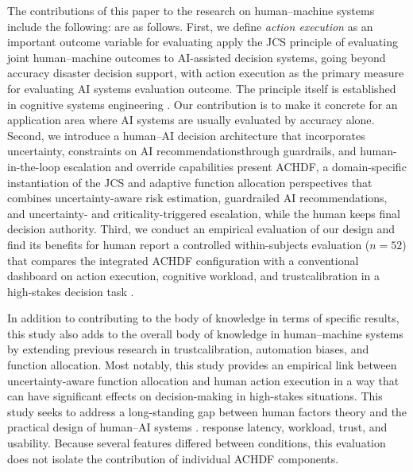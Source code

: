\documentclass[journal]{IEEEtran}
\theoremstyle{plain}
\theoremstyle{definition}
\providecommand{\DIFaddtex}[1]{{\protect\color{blue} \sf #1}} %
\providecommand{\DIFdeltex}[1]{{\protect\color{red} \scriptsize #1}} %
\providecommand{\DIFaddbegin}{} %
\providecommand{\DIFaddend}{} %
\providecommand{\DIFdelbegin}{} %
\providecommand{\DIFdelend}{} %
\providecommand{\DIFadd}[1]{\texorpdfstring{\DIFaddtex{#1}}{#1}} %
\providecommand{\DIFdel}[1]{\texorpdfstring{\DIFdeltex{#1}}{}} %
\newcommand{\DIFscaledelfig}{0.5}
\newlength{\DIFdelgraphicswidth} %
\newlength{\DIFdelgraphicsheight} %
\newcommand{\DIFaddincludegraphics}[2][]{{\color{blue}\fbox{\DIFOincludegraphics[#1]{#2}}}} %
\newcommand{\DIFdelincludegraphics}[2][]{%
\sbox{\DIFdelgraphicsbox}{\DIFOincludegraphics[#1]{#2}}%
\settoboxwidth{\DIFdelgraphicswidth}{\DIFdelgraphicsbox} %
\settoboxtotalheight{\DIFdelgraphicsheight}{\DIFdelgraphicsbox} %
\scalebox{\DIFscaledelfig}{%
\parbox[b]{\DIFdelgraphicswidth}{\usebox{\DIFdelgraphicsbox}\\[-\baselineskip] \rule{\DIFdelgraphicswidth}{0em}}\llap{\resizebox{\DIFdelgraphicswidth}{\DIFdelgraphicsheight}{%
\setlength{\unitlength}{\DIFdelgraphicswidth}%
\begin{picture}(1,1)%
\thicklines\linethickness{2pt} %
{\color[rgb]{1,0,0}\put(0,0){\framebox(1,1){}}}%
{\color[rgb]{1,0,0}\put(0,0){\line( 1,1){1}}}%
{\color[rgb]{1,0,0}\put(0,1){\line(1,-1){1}}}%
\end{picture}%
}\hspace*{3pt}}} %
} %
\DeclareRobustCommand{\DIFaddbegin}{\DIFOaddbegin \let\includegraphics\DIFaddincludegraphics} %
\DeclareRobustCommand{\DIFaddend}{\DIFOaddend \let\includegraphics\DIFOincludegraphics} %
\DeclareRobustCommand{\DIFdelbegin}{\DIFOdelbegin \let\includegraphics\DIFdelincludegraphics} %
\DeclareRobustCommand{\DIFdelend}{\DIFOaddend \let\includegraphics\DIFOincludegraphics} %
\begin{document}
\DIFadd{The }\DIFaddend contributions of this paper \DIFdelbegin \DIFdel{to the research on human--machine systems include the following: }\DIFdelend \DIFaddbegin \DIFadd{are as follows. }\DIFaddend First, we \DIFdelbegin \DIFdel{define \emph{action execution} as an important outcome variable for evaluating }\DIFdelend \DIFaddbegin \DIFadd{apply the JCS principle of evaluating joint human--machine outcomes to }\DIFaddend AI-assisted \DIFdelbegin \DIFdel{decision systems, going beyond accuracy }\DIFdelend \DIFaddbegin \DIFadd{disaster decision support, with action execution }\DIFaddend as the primary \DIFdelbegin \DIFdel{measure for evaluating AI systems \cite{Lai2023FAccT,Yang2022THMSReview}}\DIFdelend \DIFaddbegin \DIFadd{evaluation outcome. The principle itself is established in cognitive systems engineering \cite{Hollnagel2005JCS,Woods2006JCS}. Our contribution is to make it concrete for an application area where AI systems are usually evaluated by accuracy alone}\DIFaddend . Second, we \DIFdelbegin \DIFdel{introduce a human--AI decision architecture that incorporates uncertainty, constraints on AI recommendationsthrough guardrails, and human-in-the-loop escalation and override capabilities \cite{Assaad2023TAS,Bach2024Access}}\DIFdelend \DIFaddbegin \DIFadd{present ACHDF, a domain-specific instantiation of the JCS and adaptive function allocation perspectives that combines uncertainty-aware risk estimation, guardrailed AI recommendations, and uncertainty- and criticality-triggered escalation, while the human keeps final decision authority}\DIFaddend . Third, we \DIFdelbegin \DIFdel{conduct an empirical evaluation of our design and find its benefits for human }\DIFdelend \DIFaddbegin \DIFadd{report a controlled within-subjects evaluation ($n=52$) that compares the integrated ACHDF configuration with a conventional dashboard on }\DIFaddend action execution, \DIFdelbegin \DIFdel{cognitive workload, and trustcalibration in a high-stakes decision task \cite{Bach2024Access,PerezCerrolaza2024CSUR}. }%

\DIFdel{In addition to contributing to the body of knowledge in terms of specific results, this study also adds to the overall body of knowledge in human--machine systems by extending previous research in trustcalibration, automation biases, and function allocation. Most notably, this study provides an empirical link between uncertainty-aware function allocation and human action execution in a way that can have significant effects on decision-making in high-stakes situations.
This study seeks to address a long-standing gap between human factors theory and the practical design of human--AI systems \cite{Yang2022THMSReview,Hodgson2013THMS,Lai2023FAccT}. }\DIFdelend \DIFaddbegin \DIFadd{response latency, workload, trust, and usability. Because several features differed between conditions, this evaluation does not isolate the contribution of individual ACHDF components.
}\DIFaddend 
\end{document}

